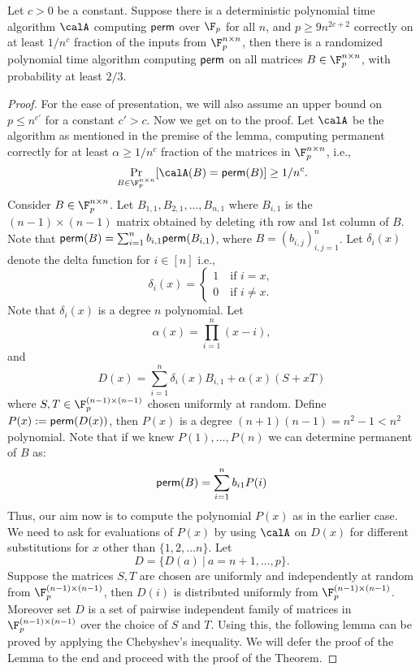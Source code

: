 \begin{theorem}
Let $c>0$ be a constant. Suppose there is a deterministic polynomial time algorithm $\calA$ computing ${\sf perm}$ over $\F_p$ for all $n$, and $p\ge 9n^{2c+2}$ correctly on at least $1/n^{c}$ fraction of the inputs from $\F_p^{n \times n}$, then there is a randomized polynomial time algorithm computing ${\sf perm}$ on all matrices $B \in \F_p^{n \times n}$, with probability at least $2/3$.
\end{theorem}
\begin{proof}
For the ease of presentation, we will also assume an upper bound on $p \le n^{c'}$ for a constant $c' > c$. Now we get on to the proof. Let $\calA$ be the algorithm as mentioned in the premise of the lemma, computing permanent correctly for at least $\alpha \ge 1/n^c$ fraction of the matrices in $\F_p^{n \times n}$, i.e.,
\[\Pr_{B\in \F_p^{n \times n}}[\calA(B) = {\sf perm}(B)] \ge 1/n^c.\]
Consider $B \in \F_p^{n \times n}$. Let $B_{1,1}, B_{2,1}, \ldots, B_{n,1}$ where $B_{i,1}$ is the $(n-1)\times (n-1)$ matrix obtained by deleting $i$th row and $1$st column of $B$.  Note that ${\sf perm }(B)= \sum_{i=1}^n b_{i,1}{\sf perm}(B_{i,1})$,
where $B= (b_{i,j})_{i,j=1}^n$. Let $\delta_i(x)$ denote the delta function for $i\in[n]$ i.e.,
\[\delta_i(x)= \begin{cases} 1~~~\mbox{ if }i=x, \\ 0~~~\mbox{ if }i\neq x. \end{cases}\]
Note that $\delta_i(x)$ is a degree $n$ polynomial. Let
\[\alpha(x)= \prod_{i=1}^n (x-i),\]
and
\[D(x)= \sum_{i=1}^{n}\delta_{i}(x)B_{i,1}+ \alpha(x)(S+ x T)\]
where $S,T \in \F_p^{(n-1) \times (n-1)}$ chosen uniformly at random. Define $P(x):= {\sf perm}(D(x))$, then $P(x)$ is a degree $(n+1)(n-1)=n^2-1<n^2$ polynomial. Note that if we knew $P(1), \ldots, P(n)$ we can determine permanent of $B$ as:
$$ {\sf perm}(B) = \sum_{i=1}^n b_{i1}P(i) $$
Thus, our aim now is to compute the polynomial $P(x)$ as in the earlier case. We need to ask for evaluations of $P(x)$ by using $\calA$ on $D(x)$ for different substitutions for $x$ other than $\{1,2, \ldots n\}$. Let 
\[D= \{D(a)~|~a=n+1,\ldots, p\}.\]
Suppose the matrices $S,T$ are chosen are uniformly and independently at random from $\F_p^{(n-1) \times (n-1)}$, then $D(i)$ is distributed uniformly from $\F_p^{(n-1) \times (n-1)}$. Moreover set $D$ is a set of pairwise independent family of matrices in $\F_p^{(n-1) \times (n-1)}$ over the choice of $S$ and $T$. Using this, the following lemma can be proved by applying the Chebyshev's inequality. We will defer the proof of the Lemma to the end and proceed with the proof of the Theorem.


\end{proof}

